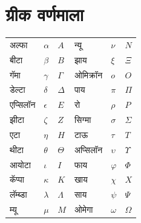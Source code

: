 \chapter{ग्रीक वर्णमाला}\label{ref:grk:chap}








\begin{center}
    \begin{tabular}{lll@{\qquad}lll}
    अल्फा &	$\alpha$ & $A$ &
    न्यू & $\nu$ & $N$ \\
    बीटा & $\beta$ & $B$ &
    झाय & $\xi$ & $\Xi$ \\
    गॅमा &	$\gamma$ & $\Gamma$ &
    ओमिक्रॉन & $o$ & $O$ \\
    डेल्टा & $\delta$ & $\Delta$ &
    पाय & $\pi$ & $\Pi$ \\
    एप्सिलॉन & $\epsilon$ & $E$ &
    रो & $\rho$ & $P$ \\
    झीटा & $\zeta$ & $Z$ &
    सिग्मा &	$\sigma$ & $\Sigma$ \\
    एटा & $\eta$ & $H$ &
    टाऊ & $\tau$ & $T$ \\
    थीटा & $\theta$ & $\Theta$ &
    अप्सिलॉन & $\upsilon$ & $\Upsilon$ \\
    आयोटा & $\iota$ & $I$ &
    फाय & $\varphi$ & $\Phi$ \\
    कॅप्पा & $\kappa$ & $K$ &
    खाय & $\chi$ & $X$ \\
    लॅम्ब्डा & $\lambda$ & $\Lambda$ &
    साय & $\psi$ & $\Psi$ \\
    म्यू & $\mu$ & $M$ &
    ओमेगा & $\omega$ & $\Omega$
    \end{tabular}
\end{center}



